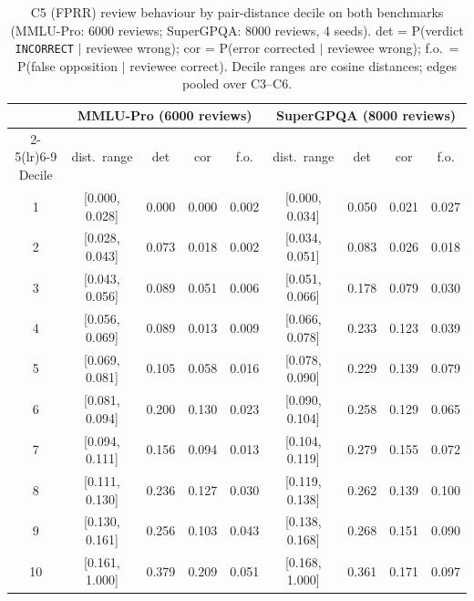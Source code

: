 \documentclass[11pt]{article}
\begin{document}
\begin{table}[t]
\centering
\small
\caption{C5 (FPRR) review behaviour by pair-distance decile on both benchmarks (MMLU-Pro: 6000 reviews; SuperGPQA: 8000 reviews, 4 seeds). det = P(verdict \texttt{INCORRECT} $\mid$ reviewee wrong); cor = P(error corrected $\mid$ reviewee wrong); f.o.\ = P(false opposition $\mid$ reviewee correct). Decile ranges are cosine distances; edges pooled over C3--C6.}
\label{tab:deciles}
\begin{tabular}{ccccccccc}
\toprule
 & \multicolumn{4}{c}{MMLU-Pro (6000 reviews)} & \multicolumn{4}{c}{SuperGPQA (8000 reviews)} \\
\cmidrule(lr){2-5}\cmidrule(lr){6-9}
Decile & dist.\ range & det & cor & f.o. & dist.\ range & det & cor & f.o. \\
\midrule
1  & [0.000, 0.028] & 0.000 & 0.000 & 0.002 & [0.000, 0.034] & 0.050 & 0.021 & 0.027 \\
2  & [0.028, 0.043] & 0.073 & 0.018 & 0.002 & [0.034, 0.051] & 0.083 & 0.026 & 0.018 \\
3  & [0.043, 0.056] & 0.089 & 0.051 & 0.006 & [0.051, 0.066] & 0.178 & 0.079 & 0.030 \\
4  & [0.056, 0.069] & 0.089 & 0.013 & 0.009 & [0.066, 0.078] & 0.233 & 0.123 & 0.039 \\
5  & [0.069, 0.081] & 0.105 & 0.058 & 0.016 & [0.078, 0.090] & 0.229 & 0.139 & 0.079 \\
6  & [0.081, 0.094] & 0.200 & 0.130 & 0.023 & [0.090, 0.104] & 0.258 & 0.129 & 0.065 \\
7  & [0.094, 0.111] & 0.156 & 0.094 & 0.013 & [0.104, 0.119] & 0.279 & 0.155 & 0.072 \\
8  & [0.111, 0.130] & 0.236 & 0.127 & 0.030 & [0.119, 0.138] & 0.262 & 0.139 & 0.100 \\
9  & [0.130, 0.161] & 0.256 & 0.103 & 0.043 & [0.138, 0.168] & 0.268 & 0.151 & 0.090 \\
10 & [0.161, 1.000] & 0.379 & 0.209 & 0.051 & [0.168, 1.000] & 0.361 & 0.171 & 0.097 \\
\bottomrule
\end{tabular}
\end{table}
\end{document}

